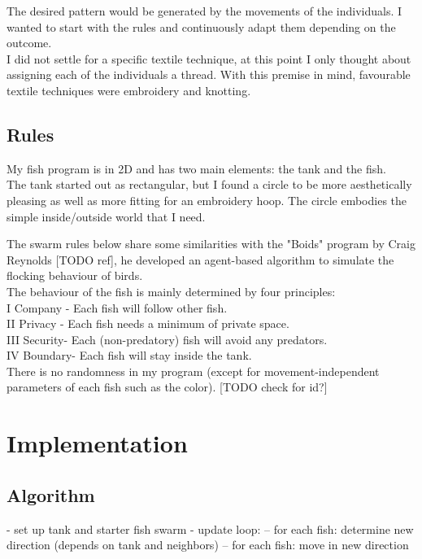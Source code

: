 \documentclass{scrartcl}
\begin{document}
The desired pattern would be generated by the movements of the individuals. I wanted to start with the rules and continuously adapt them depending on the outcome.\\
I did not settle for a specific textile technique, at this point I only thought about assigning each of the individuals a thread. With this premise in mind, favourable textile techniques were embroidery and knotting.


\subsection{Rules}

My fish program is in 2D and has two main elements: the tank and the fish.\\

The tank started out as rectangular, but I found a circle to be more aesthetically pleasing as well as more fitting for an embroidery hoop. The circle embodies the simple inside/outside world that I need.

The swarm rules below share some similarities with the "Boids" program by Craig Reynolds [TODO ref], he developed an agent-based algorithm to simulate the flocking behaviour of birds.\\

The behaviour of the fish is mainly determined by four principles:\\
I Company - Each fish will follow other fish.\\
II Privacy - Each fish needs a minimum of private space.\\
III Security- Each (non-predatory) fish will avoid any predators.\\
IV Boundary- Each fish will stay inside the tank.\\

There is no randomness in my program (except for movement-independent parameters of each fish such as the color). [TODO check for id?]

\section{Implementation}


\subsection{Algorithm} 

- set up tank and starter fish swarm
- update loop:
-- for each fish: determine new direction (depends on tank and neighbors)
-- for each fish: move in new direction
\end{document}
